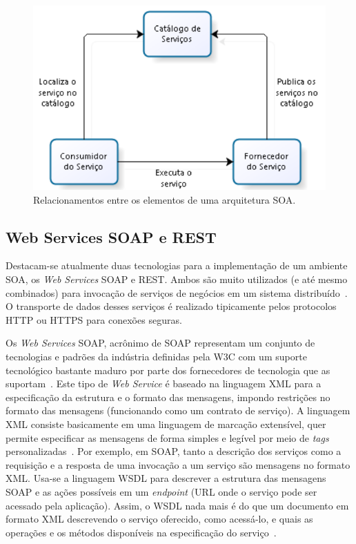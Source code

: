 \begin{figure}[!hbt]
\centering
\includegraphics[scale=0.80]{img/fundamentos/soa.pdf}
\caption{Relacionamentos entre os elementos de uma arquitetura \acrshort{SOA}.}
\label{fig:soa}
\end{figure}




\subsection{Web Services \acrshort{SOAP} e REST}\label{tec_web_services}%

Destacam-se atualmente duas tecnologias para a implementação 
de um ambiente \acrshort{SOA}, os \textit{Web Services} \acrshort{SOAP} e  \acrshort{REST}. Ambos são muito utilizados (e até mesmo combinados) para invocação de serviços de negócios em um sistema distribuído~\cite{SOAIntBlueprint:2010,SOA_patterns_2012}. O transporte de dados desses serviços é realizado tipicamente pelos protocolos \acrfull{HTTP} ou \acrfull{HTTPS} para conexões seguras. 

Os \textit{Web Services} \acrshort{SOAP}, acrônimo de \acrlong{SOAP} representam um conjunto de tecnologias e padrões da indústria definidas pela \acrfull{W3C} com um suporte tecnológico bastante maduro por parte dos fornecedores de tecnologia que as suportam~\cite{S04_IntLgSw:2006}. Este tipo de \textit{Web Service} é baseado na linguagem \acrfull{XML} para a especificação da estrutura e o formato das mensagens, impondo restrições no formato das mensagens (funcionando como um contrato de serviço). A linguagem \acrshort{XML} consiste basicamente em uma linguagem de marcação extensível, quer permite especificar as mensagens de forma simples e legível por meio de \textit{tags} personalizadas~\cite{S04_IntLgSw:2006}. Por exemplo, em \acrshort{SOAP}, tanto a descrição dos serviços como a requisição e a resposta de uma invocação a um serviço são mensagens no formato \acrshort{XML}. Usa-se a linguagem \acrshort{WSDL} para descrever a estrutura das mensagens \acrshort{SOAP} e as ações possíveis em um \textit{endpoint} (\acrshort{URL} onde o serviço pode ser acessado pela aplicação). Assim, o \acrshort{WSDL} nada mais é do que um documento em formato \acrshort{XML} descrevendo o serviço oferecido, como acessá-lo, e quais as operações e os métodos disponíveis na especificação do serviço~\cite{SOAIntBlueprint:2010}. 




